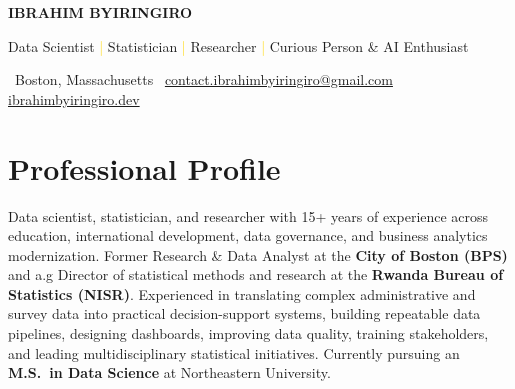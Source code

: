 \documentclass[10pt,letterpaper]{article}
\newcommand{\icLoc}{\faMapMarker*}
\newcommand{\icMail}{\faEnvelope}
\newcommand{\icWeb}{\faGlobe}
\newcommand{\icLoc}{\textbullet}
\newcommand{\icMail}{\Letter}
\newcommand{\icWeb}{\ComputerMouse}
\begin{document}

\vspace*{-0.12in}
{\color{ink}
  {\fontsize{30}{34}\selectfont\bfseries\color{navy} IBRAHIM \textcolor{accent}{BYIRINGIRO}}\par\vspace{5pt}
  {\large\color{navy} Data Scientist \;\textcolor{gold}{|}\; Statistician \;\textcolor{gold}{|}\; Researcher \;\textcolor{gold}{|}\; Curious Person \& AI Enthusiast}\par\vspace{8pt}
  {\small
    \textcolor{accent}{\icLoc}\, Boston, Massachusetts \qquad
    \textcolor{accent}{\icMail}\, \href{mailto:contact.ibrahimbyiringiro@gmail.com}{contact.ibrahimbyiringiro@gmail.com} \qquad
    \textcolor{accent}{\icWeb}\, \href{https://www.ibrahimbyiringiro.dev}{ibrahimbyiringiro.dev}}\par
}
\vspace{0.28in}

\section{Professional Profile}
Data scientist, statistician, and researcher with 15+ years of experience across education, international development, data governance, and business analytics modernization. Former Research \& Data Analyst at the \textbf{City of Boston (BPS)} and a.g Director of statistical methods and research at the \textbf{Rwanda Bureau of Statistics (NISR)}. Experienced in translating complex administrative and survey data into practical decision-support systems, building repeatable data pipelines, designing dashboards, improving data quality, training stakeholders, and leading multidisciplinary statistical initiatives. Currently pursuing an \textbf{M.S.\ in Data Science} at Northeastern University.

\end{document}
